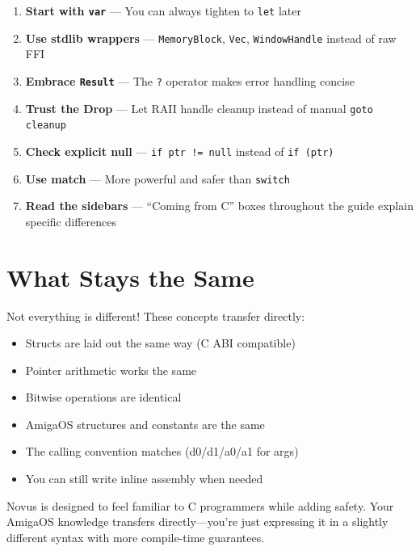 \begin{enumerate}
    \item \textbf{Start with \texttt{var}} --- You can always tighten to \texttt{let} later
    \item \textbf{Use stdlib wrappers} --- \texttt{MemoryBlock}, \texttt{Vec}, \texttt{WindowHandle} instead of raw FFI
    \item \textbf{Embrace \texttt{Result}} --- The \texttt{?} operator makes error handling concise
    \item \textbf{Trust the Drop} --- Let RAII handle cleanup instead of manual \texttt{goto cleanup}
    \item \textbf{Check explicit null} --- \texttt{if ptr != null} instead of \texttt{if (ptr)}
    \item \textbf{Use match} --- More powerful and safer than \texttt{switch}
    \item \textbf{Read the sidebars} --- ``Coming from C'' boxes throughout the guide explain specific differences
\end{enumerate}

\section{What Stays the Same}

Not everything is different! These concepts transfer directly:

\begin{itemize}
    \item Structs are laid out the same way (C ABI compatible)
    \item Pointer arithmetic works the same
    \item Bitwise operations are identical
    \item AmigaOS structures and constants are the same
    \item The calling convention matches (d0/d1/a0/a1 for args)
    \item You can still write inline assembly when needed
\end{itemize}

Novus is designed to feel familiar to C programmers while adding safety. Your AmigaOS knowledge transfers directly---you're just expressing it in a slightly different syntax with more compile-time guarantees.
